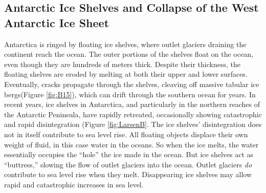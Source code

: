 \subsection{Antarctic Ice Shelves and Collapse of the West Antarctic Ice Sheet}
Antarctica is ringed by floating ice shelves, where outlet glaciers draining the continent reach the ocean. The outer portions of the shelves float on the ocean, even though they are hundreds of meters thick. Despite their thickness, the floating shelves are eroded by melting at both their upper and lower surfaces. Eventually, cracks propagate through the shelves, cleaving off massive tabular ice bergs(Figure \ref{fig:B15}), which can drift through the southern ocean for years. In recent years, ice shelves in Antarctica, and particularly in the northern reaches of the Antarctic Peninsula, have rapidly retreated, occasionally showing catastrophic and rapid disintegration (Figure \ref{fig:LarsenB}. The ice shelves' disintegration does not in itself contribute to sea level rise. All floating objects displace their own weight of fluid, in this case water in the oceans. So when the ice melts, the water essentially occupies the ``hole'' the ice made in the ocean. But ice shelves act as ``buttress,'' slowing the flow of outlet glaciers into the ocean. Outlet glaciers \emph{do} contribute to sea level rise when they melt. Disappearing ice shelves may allow rapid and catastrophic increases in sea level.\\

